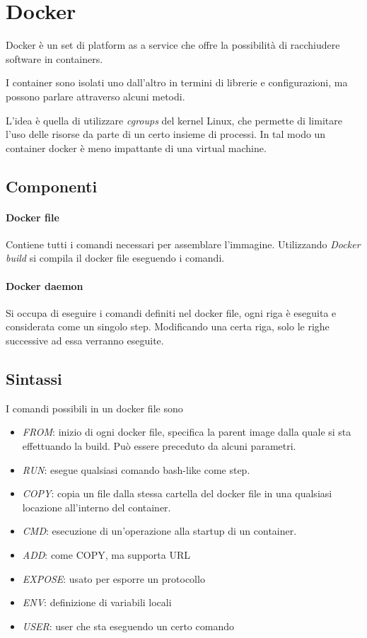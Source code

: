 \section{Docker}
Docker è un set di platform as a service che offre la possibilità di 
racchiudere software in containers. 

I container sono isolati uno dall'altro in termini di librerie e configurazioni, 
ma possono parlare attraverso alcuni metodi.

L'idea è quella di utilizzare \emph{cgroups} del kernel Linux, che permette
di limitare l'uso delle risorse da parte di un certo insieme di processi.
In tal modo un container docker è meno impattante di una virtual machine.

\subsection{Componenti}

\paragraph{Docker file}
Contiene tutti i comandi necessari per assemblare l'immagine.
Utilizzando \emph{Docker build} si compila il docker file eseguendo i comandi.

\paragraph{Docker daemon} 
Si occupa di eseguire i comandi definiti nel docker file, ogni riga è eseguita
e considerata come un singolo step.
Modificando una certa riga, solo le righe successive ad essa verranno eseguite.

\subsection{Sintassi}
I comandi possibili in un docker file sono
\begin{itemize}
    \item \emph{FROM}: inizio di ogni docker file, specifica la parent image dalla quale si sta effettuando 
    la build. Può essere preceduto da alcuni parametri.
    \item \emph{RUN}: esegue qualsiasi comando bash-like come step.
    \item \emph{COPY}: copia un file dalla stessa cartella del docker file in una qualsiasi locazione 
    all'interno del container.
    \item \emph{CMD}: esecuzione di un'operazione alla startup di un container.
    \item \emph{ADD}: come COPY, ma supporta URL
    \item \emph{EXPOSE}: usato per esporre un protocollo
    \item \emph{ENV}: definizione di variabili locali 
    \item \emph{USER}: user che sta eseguendo un certo comando
\end{itemize}

